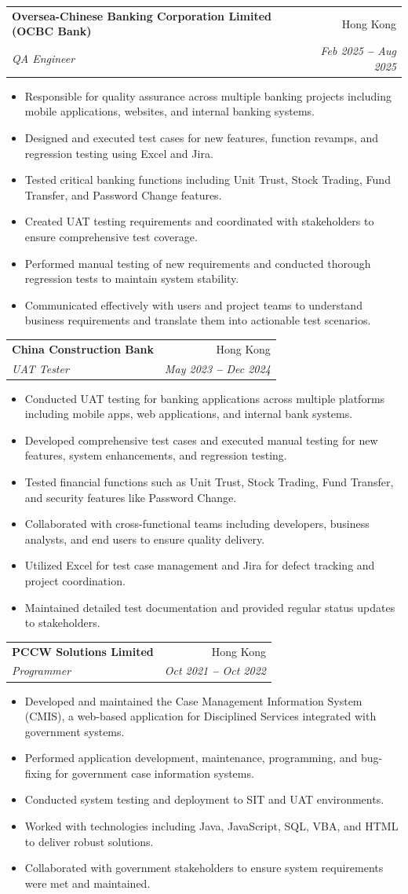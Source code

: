 \documentclass[letterpaper,11pt]{article}
\makeatletter
\newcommand{\resumeItem}[1]{
  \item\small{
    {#1 \vspace{-2pt}}
  }
}
\newcommand{\resumeSubheading}[4]{
  \vspace{-2pt}\item
    \begin{tabular*}{0.97\textwidth}[t]{l@{\extracolsep{\fill}}r}
      \textbf{#1} & #2 \\
      \textit{\small#3} & \textit{\small #4} \\
    \end{tabular*}\vspace{-7pt}
}
\newcommand{\resumeItemListStart}{\begin{itemize}}
\newcommand{\resumeItemListEnd}{\end{itemize}\vspace{-5pt}}
\makeatother
\begin{document}
    \resumeSubheading
      {Oversea-Chinese Banking Corporation Limited (OCBC Bank)}{Hong Kong}
      {QA Engineer}{Feb 2025 \textbf{--} Aug 2025}
        \resumeItemListStart
            \resumeItem{Responsible for quality assurance across multiple banking projects including mobile applications, websites, and internal banking systems.}
            \resumeItem{Designed and executed test cases for new features, function revamps, and regression testing using Excel and Jira.}
            \resumeItem{Tested critical banking functions including Unit Trust, Stock Trading, Fund Transfer, and Password Change features.}
            \resumeItem{Created UAT testing requirements and coordinated with stakeholders to ensure comprehensive test coverage.}
            \resumeItem{Performed manual testing of new requirements and conducted thorough regression tests to maintain system stability.}
            \resumeItem{Communicated effectively with users and project teams to understand business requirements and translate them into actionable test scenarios.}
        \resumeItemListEnd

    \resumeSubheading
      {China Construction Bank}{Hong Kong}
      {UAT Tester}{May 2023 \textbf{--} Dec 2024}
        \resumeItemListStart
            \resumeItem{Conducted UAT testing for banking applications across multiple platforms including mobile apps, web applications, and internal bank systems.}
            \resumeItem{Developed comprehensive test cases and executed manual testing for new features, system enhancements, and regression testing.}
            \resumeItem{Tested financial functions such as Unit Trust, Stock Trading, Fund Transfer, and security features like Password Change.}
            \resumeItem{Collaborated with cross-functional teams including developers, business analysts, and end users to ensure quality delivery.}
            \resumeItem{Utilized Excel for test case management and Jira for defect tracking and project coordination.}
            \resumeItem{Maintained detailed test documentation and provided regular status updates to stakeholders.}
        \resumeItemListEnd

    \resumeSubheading
      {PCCW Solutions Limited}{Hong Kong}
      {Programmer}{Oct 2021 \textbf{--} Oct 2022}
        \resumeItemListStart
            \resumeItem{Developed and maintained the Case Management Information System (CMIS), a web-based application for Disciplined Services integrated with government systems.}
            \resumeItem{Performed application development, maintenance, programming, and bug-fixing for government case information systems.}
            \resumeItem{Conducted system testing and deployment to SIT and UAT environments.}
            \resumeItem{Worked with technologies including Java, JavaScript, SQL, VBA, and HTML to deliver robust solutions.}
            \resumeItem{Collaborated with government stakeholders to ensure system requirements were met and maintained.}
        \resumeItemListEnd
\end{document}
